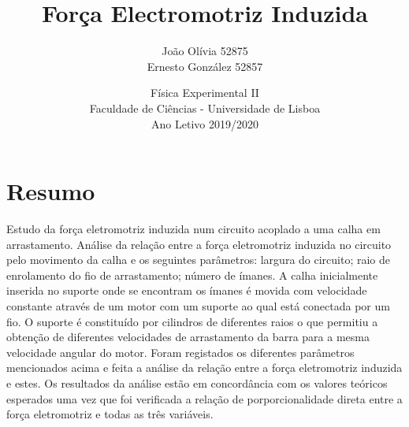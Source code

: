 \documentclass[11pt]{report}
\begin{document}
\title{Força Electromotriz Induzida}
\author{João Olívia 52875\\
		Ernesto González 52857\\}
\date{Física Experimental II\\
	  Faculdade de Ciências - Universidade de Lisboa\\
	  Ano Letivo 2019/2020}

\maketitle
\tableofcontents
\chapter{Resumo}
Estudo da força eletromotriz induzida num circuito acoplado a uma calha em arrastamento. Análise da relação entre a força eletromotriz induzida no circuito pelo movimento da calha e os seguintes parâmetros: largura do circuito; raio de enrolamento do fio de arrastamento; número de ímanes. A calha inicialmente inserida no suporte onde se encontram os ímanes é movida com velocidade constante através de um motor com um suporte ao qual está conectada por um fio. O suporte é constituído por cilindros de diferentes raios o que permitiu a obtenção de diferentes velocidades de arrastamento da barra para a mesma velocidade angular do motor. Foram registados os diferentes parâmetros mencionados acima e feita a análise da relação entre a força eletromotriz induzida e estes. Os resultados da análise estão em concordância com os valores teóricos esperados uma vez que foi verificada a relação de  porporcionalidade direta entre a força eletromotriz e todas as três variáveis.
\end{document}
